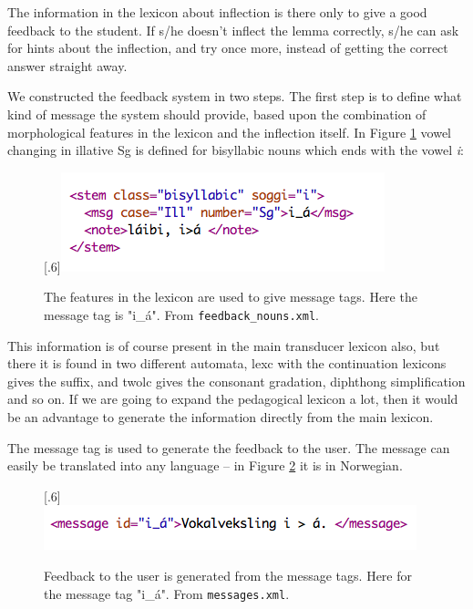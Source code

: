 \documentclass[a4paper,12pt]{article}
\begin{document}
The information in the lexicon about inflection is there only to give a good feedback to the student. If s/he doesn't inflect the lemma correctly, s/he can ask for hints about the inflection, and try once more, instead of getting the correct answer straight away. 

We constructed the feedback system in two steps. The first step is to define what kind of message the system should provide, based upon the combination of morphological features in the lexicon and the inflection itself. In Figure \ref{feedbacknouns} vowel changing in illative Sg is defined for bisyllabic nouns which ends with the vowel \textit{i}:


\begin{figure}[htbp]
\begin{center}
\scalebox{.6}[.6]{\includegraphics{presentation/img/feedback_nouns.png}}\\
\caption{The features in the lexicon are used to give message tags. Here the message tag is "i\_á". From \texttt{feedback\_nouns.xml}.}
\label{feedbacknouns}
\end{center}
\end{figure}

This information is of course present in the main transducer lexicon also, but there it is found in two different automata, lexc with the continuation lexicons gives the suffix, and twolc gives the consonant gradation, diphthong simplification and so on. If we are going to expand the pedagogical lexicon a lot, then it would be an advantage to generate the information directly from the main lexicon. 

The message tag is used to generate the feedback to the user. The message can easily be translated into any language -- in Figure \ref{mess} it is in Norwegian.

\begin{figure}[htbp]
\begin{center}
\scalebox{.6}[.6]{\includegraphics{presentation/img/messages.png}}\\
\caption{Feedback to the user is generated from the message tags. Here for the message tag "i\_á". From \texttt{messages.xml}.}
\label{mess}
\end{center}
\end{figure}
\end{document}
